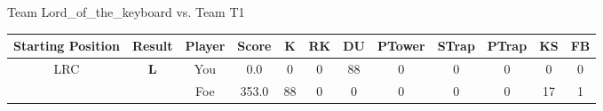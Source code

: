 \documentclass[a4paper,12pt]{article}
\begin{document}
\begin{tabular}[t]{| c | c | c | c | c | c | c | c | c | c | c | c
      |}
                      
      
                      
      
                      
                        \hline
                      \end{tabular}
                      
  \vspace*{2em}
  \par {\large {\color{Gray} Team} Lord\_of\_the\_keyboard {\color{Gray}
      vs. Team} T1}
  \newline
  \begin{tabular}[t]{| c | c | c | c | c | c | c | c | c | c | c | c
      |}
    \hline
    Starting Position & \textbf{Result} & Player & \textbf{Score} & K & RK & DU & PTower & STrap & PTrap & KS & FB \\
    
      
                      
      
                      
      
                      
      
        \hline
        \multirow{2}{*}{  LRC
             } &
              \multirow{2}{*}{  \textbf{L}  } & 
                    \cellcolor{yellow!25} You & \cellcolor{yellow!25} 0.0 & \cellcolor{yellow!25} 0 &
                    \cellcolor{yellow!25} 0 & \cellcolor{yellow!25} 88 & \cellcolor{yellow!25} 0 &
                    \cellcolor{yellow!25} 0 & \cellcolor{yellow!25} 0 & \cellcolor{yellow!25} 0 &
                    \cellcolor{yellow!25} 0 \\
                    \cline{3-12}
                    & & \cellcolor{red!15} Foe & \cellcolor{red!15} 353.0 & \cellcolor{red!15} 88 & \cellcolor{red!15}
                    0 & \cellcolor{red!15} 0
                    & \cellcolor{red!15} 0 & \cellcolor{red!15}
                    0 & \cellcolor{red!15} 0 
                    & \cellcolor{red!15} 17 & \cellcolor{red!15}
                    1 \\
                    
                      
      
                      
      
                      
      
                      
      
                      
      
                      
      
                      
      

\end{tabular}
\end{document}
